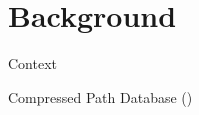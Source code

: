 \section*{Background}

\begin{frame}{Context}

\end{frame}

\begin{frame}{Compressed Path Database (\CPD{})}
    
\end{frame}

\begin{frame}{\ALT{}}
    
\end{frame}

\begin{frame}{\AWA{}}
    
\end{frame}